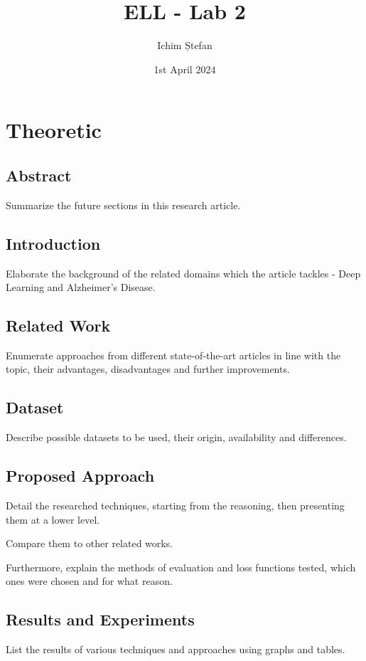 \documentclass[a4paper]{article}
\title{ELL - Lab 2}
\author{Ichim Ștefan}
\date{1st April 2024}
\begin{document}
\maketitle

\tableofcontents

\newpage

\section{Theoretic}

\subsection{Abstract}
Summarize the future sections in this research article.

\subsection{Introduction}
Elaborate the background of the related domains which the article tackles - Deep Learning and Alzheimer's Disease.

\subsection{Related Work}
Enumerate approaches from different state-of-the-art articles in line with the topic, their advantages, disadvantages and
further improvements.

\subsection{Dataset}
Describe possible datasets to be used, their origin, availability and differences.

\subsection{Proposed Approach}
Detail the researched techniques, starting from the reasoning, then presenting them at a lower level.

Compare them to other related works.

Furthermore, explain the methods of evaluation and loss functions tested, which ones were chosen and for what reason.

\subsection{Results and Experiments}
List the results of various techniques and approaches using graphs and tables.
\end{document}
